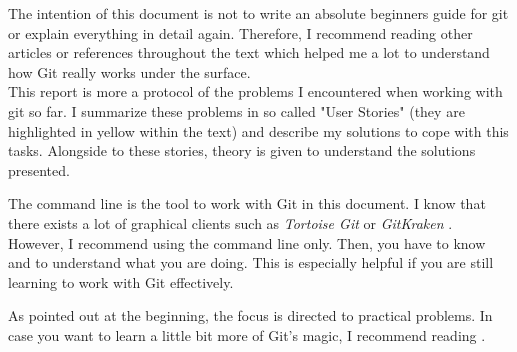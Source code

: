 The intention of this document is not to write an absolute beginners guide for git or explain everything in detail again. 
Therefore, I recommend reading other articles or references throughout the text which helped me a lot to understand how Git really
works under the surface. 
\\
This report is more a protocol of 
the problems I encountered when working with git so far. I summarize these problems in so called "User Stories"
(they are highlighted in yellow within the text) and describe my solutions to cope with this tasks. Alongside to these stories,
theory is given to understand the solutions presented.



The command line is the tool to work with Git in this document. I know that there exists a lot of graphical clients such as 
\textit{Tortoise Git} or \textit{GitKraken} \cite{Unknown2021Tortoise,Unknown2021Kraken}. However, I recommend using the 
command line only. Then, you have to know and to understand what you are doing. This is especially helpful if you are still 
learning to work with Git effectively.


As pointed out at the beginning, the focus is directed to practical problems. In case you want to learn a little bit more of 
Git's magic, I recommend reading \cite{2017wiegleygi}.
